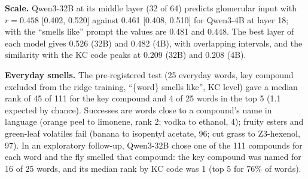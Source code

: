 \textbf{Scale.} Qwen3-32B at its middle layer (32 of 64) predicts glomerular input with $r=0.458$ [0.402, 0.520] against 0.461 [0.408, 0.510] for Qwen3-4B at layer 18; with the ``smells like'' prompt the values are 0.481 and 0.448. The best layer of each model gives 0.526 (32B) and 0.482 (4B), with overlapping intervals, and the similarity with the KC code peaks at 0.209 (32B) and 0.208 (4B).

\textbf{Everyday smells.} The pre-registered test (25 everyday words, key compound excluded from the ridge training, ``\{word\} smells like'', KC level) gave a median rank of 45 of 111 for the key compound and 4 of 25 words in the top 5 (1.1 expected by chance). Successes are words close to a compound's name in language (orange peel to limonene, rank 2; vodka to ethanol, 4); fruity esters and green-leaf volatiles fail (banana to isopentyl acetate, 96; cut grass to Z3-hexenol, 97). In an exploratory follow-up, Qwen3-32B chose one of the 111 compounds for each word and the fly smelled that compound: the key compound was named for 16 of 25 words, and its median rank by KC code was 1 (top 5 for 76\% of words).
